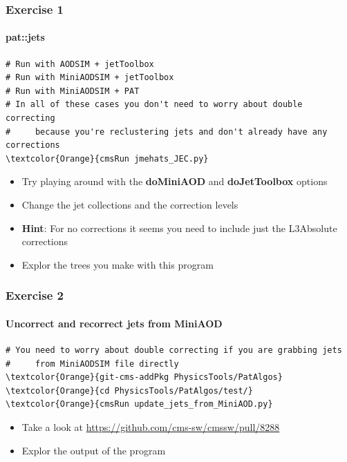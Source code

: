 \begin{frame}[fragile]
	\frametitle{Exercise 1}
	\framesubtitle{pat::jets}

\begin{Verbatim}[label={Exercise 1}]
# Run with AODSIM + jetToolbox
# Run with MiniAODSIM + jetToolbox
# Run with MiniAODSIM + PAT
# In all of these cases you don't need to worry about double correcting
#     because you're reclustering jets and don't already have any corrections
\textcolor{Orange}{cmsRun jmehats_JEC.py}
\end{Verbatim}

\begin{block}{}
	\begin{itemize}
		\item Try playing around with the \textbf{doMiniAOD} and \textbf{doJetToolbox} options
		\item Change the jet collections and the correction levels
		\item \textbf{Hint}: For no corrections it seems you need to include just the L3Absolute corrections
		\item Explor the trees you make with this program
	\end{itemize}
\end{block}

\end{frame}

\begin{frame}[fragile]
	\frametitle{Exercise 2}
	\framesubtitle{Uncorrect and recorrect jets from MiniAOD}

\begin{Verbatim}[label={Exercise 2}]
# You need to worry about double correcting if you are grabbing jets
#     from MiniAODSIM file directly
\textcolor{Orange}{git-cms-addPkg PhysicsTools/PatAlgos}
\textcolor{Orange}{cd PhysicsTools/PatAlgos/test/}
\textcolor{Orange}{cmsRun update_jets_from_MiniAOD.py}
\end{Verbatim}

\begin{block}{}
	\begin{itemize}
		\item Take a look at \href{https://github.com/cms-sw/cmssw/pull/8288}{https://github.com/cms-sw/cmssw/pull/8288}
		\item Explor the output of the program
	\end{itemize}
\end{block}

\end{frame}

